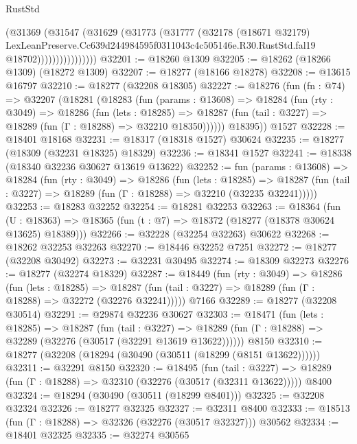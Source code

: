 \begin{lexlean}{RustStd}
\begin{coremodule}
                        (@31369
                          (@31547
                            (@31629
                              (@31773
                                (@31777
                                  (@32178
                                    (@18671 @32179)
                                    LexLeanPreserve.Cc639d244984595f0311043c4c505146e.R30.RustStd.fal19
                                    @18702))))))))))))))))
@32201 := @18260 @1309
@32205 := @18262 (@18266 @1309) (@18272 @1309)
@32207 := @18277 (@18166 @18278)
@32208 := @13615 @16797
@32210 := @18277 (@32208 @18305)
@32227 := @18276
    (fun (fn : @74) =>
    @32207
      (@18281
        (@18283
          (fun (params : @13608) =>
          @18284
            (fun (rty : @3049) =>
            @18286
              (fun (lets : @18285) =>
              @18287 (fun (tail : @3227) => @18289 (fun (Γ : @18288) => @32210 @18350))))))
        @18395))
    @1527
@32228 := @18401 @18168
@32231 := @18317 (@18318 @1527) @30624
@32235 := @18277 (@18309 (@32231 @18325) @18329)
@32236 := @18341 @1527
@32241 := @18338 (@18340 @32236 @30627 @13619 @13622)
@32252 := fun (params : @13608) =>
  @18284
    (fun (rty : @3049) =>
    @18286
      (fun (lets : @18285) =>
      @18287 (fun (tail : @3227) => @18289 (fun (Γ : @18288) => @32210 (@32235 @32241)))))
@32253 := @18283 @32252
@32254 := @18281 @32253
@32263 := @18364
    (fun (U : @18363) => @18365 (fun (t : @7) => @18372 (@18277 (@18378 @30624 @13625) @18389)))
@32266 := @32228 (@32254 @32263) @30622
@32268 := @18262 @32253 @32263
@32270 := @18446 @32252 @7251
@32272 := @18277 (@32208 @30492)
@32273 := @32231 @30495
@32274 := @18309 @32273
@32276 := @18277 (@32274 @18329)
@32287 := @18449
    (fun (rty : @3049) =>
    @18286
      (fun (lets : @18285) =>
      @18287 (fun (tail : @3227) => @18289 (fun (Γ : @18288) => @32272 (@32276 @32241)))))
    @7166
@32289 := @18277 (@32208 @30514)
@32291 := @29874 @32236 @30627
@32303 := @18471
    (fun (lets : @18285) =>
    @18287
      (fun (tail : @3227) =>
      @18289 (fun (Γ : @18288) => @32289 (@32276 (@30517 (@32291 @13619 @13622))))))
    @8150
@32310 := @18277 (@32208 (@18294 (@30490 (@30511 (@18299 (@8151 @13622))))))
@32311 := @32291 @8150
@32320 := @18495
    (fun (tail : @3227) => @18289 (fun (Γ : @18288) => @32310 (@32276 (@30517 (@32311 @13622)))))
    @8400
@32324 := @18294 (@30490 (@30511 (@18299 @8401)))
@32325 := @32208 @32324
@32326 := @18277 @32325
@32327 := @32311 @8400
@32333 := @18513 (fun (Γ : @18288) => @32326 (@32276 (@30517 @32327))) @30562
@32334 := @18401 @32325
@32335 := @32274 @30565

\end{coremodule}
\end{lexlean}
